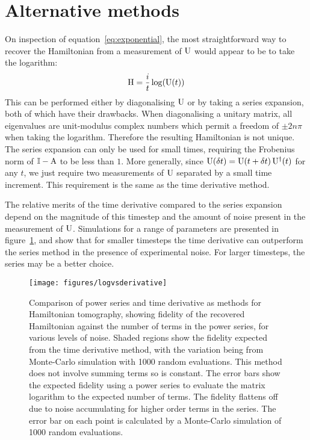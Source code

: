 \section{Alternative methods}
\label{sec:Alternatives}
On inspection of equation~\ref{eq:exponential}, the most straightforward way to
recover the Hamiltonian from a measurement of \(\mathrm{U}\) would appear to be to
take the logarithm:
\begin{equation}
  \mathrm{H} = \frac{i}{t} \log \!\left(\mathrm{U} \!\left(t\right)\right)
\end{equation}
This can be performed either by diagonalising \(\mathrm{U}\) or by taking a series
expansion, both of which have their drawbacks. When diagonalising a unitary
matrix, all eigenvalues are unit-modulus complex numbers which permit a freedom
of \(\pm 2 n \pi\) when taking the logarithm. Therefore the resulting
Hamiltonian is not unique. The series expansion can only be used for small
times, requiring the Frobenius norm of \(\mathbb{I}-\mathrm{A}\) to be less than
\(1\). More generally, since \(\mathrm{U} \!\left(\delta t\right) = \mathrm{U} \!\left(t+\delta t\right)
\mathrm{U}^{\dagger} \!\left(t\right)\) for any \(t\), we just require two measurements of
\(\mathrm{U}\) separated by a small time increment. This requirement is the same as
the time derivative method.

The relative merits of the time derivative compared to the series expansion
depend on the magnitude of this timestep and the amount of noise present in the
measurement of \(\mathrm{U}\). Simulations for a range of parameters are presented
in figure~\ref{fig:logvsderivative}, and show that for smaller timesteps the
time derivative can outperform the series method in the presence of experimental
noise. For larger timesteps, the series may be a better choice.

\begin{figure}[h]
  \texttt{[image: figures/logvsderivative]}
  \caption[Comparison of power series and time derivative methods for
  Hamiltonian recovery]
  {Comparison of power series and time derivative as methods for Hamiltonian
  tomography, showing fidelity of the recovered Hamiltonian against the number
  of terms in the power series, for various levels of noise. Shaded regions show
  the fidelity expected from the time derivative method, with the variation
  being from Monte-Carlo simulation with 1000 random evaluations. This method
  does not involve summing terms so is constant. The error bars show the
  expected fidelity using a power series to evaluate the matrix logarithm to the
  expected number of terms. The fidelity flattens off due to noise accumulating
  for higher order terms in the series. The error bar on each point is
  calculated by a Monte-Carlo simulation of 1000 random evaluations.}
  \label{fig:logvsderivative}
\end{figure}

